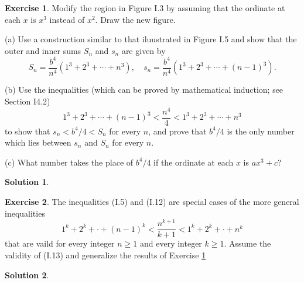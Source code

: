 \documentclass[11pt,a4paper]{book}
\theoremstyle{definition}
\newtheorem{exercise}{Exercise}
\newtheorem{solution}{Solution}
\begin{document}

\begin{exercise}\label{ex:1}
  Modify the region in Figure I.3 by assuming that the ordinate at each $x$ is $x^3$ instead of $x^2$.
  Draw the new figure.

  (a) Use a construction similar to that iluustrated in Figure I.5 and show that the outer and inner
  sums $S_n$ and $s_n$ are given by
  \[
  S_n = \frac{b^4}{n^4} \left( 1^3 + 2^3 + \cdots + n^3 \right), \quad s_n = \frac{b^4}{n^4} \left( 1^3 + 2^3 + \cdots + (n-1)^3 \right).
  \]

  (b) Use the inequalities (which can be proved by mathematical induction; see Section I4.2)
  \[
  \tag{I.12} 1^3 + 2^3 + \cdots + (n - 1)^3 < \frac{n^4}{4} < 1^3 + 2^3 + \cdots + n^3
  \]
  to show that $s_n < b^4 /4 < S_n$ for every $n$, and prove that $b^4/4$ is the only number which lies between $s_n$ and $S_n$ for every $n$.

  (c) What number takes the place of $b^4/4$ if the ordinate at each $x$ is $ax^3+c$?
\end{exercise}

\begin{solution}
\end{solution}
\vrule


\begin{exercise}
  The inequalities (I.5) and (I.12) are special cases of the more general inequalities
  \[
  \tag{I.13}  1^k + 2^k + \cdot + (n - 1)^k < \frac{n^{k+1}}{k+1} < 1^k + 2^k + \cdot + n^k
  \]
  that are vaild for every integer $n \ge 1$ and every integer $k \ge 1$. Assume the validity of (I.13) and generalize the results of Exercise \ref{ex:1}
\end{exercise}

\begin{solution}
\end{solution}
\end{document}
